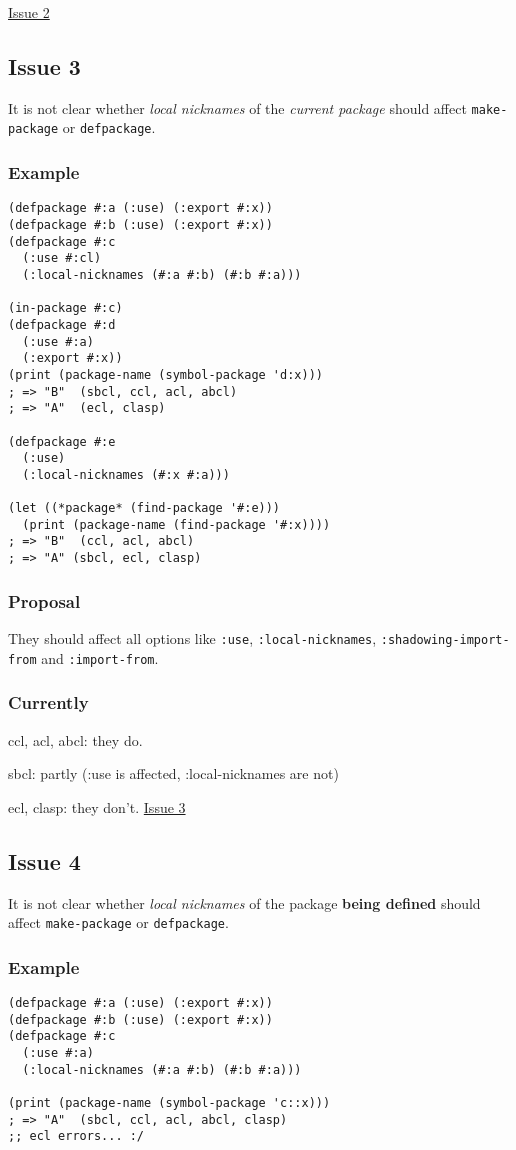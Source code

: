 \documentclass[11pt]{article}
\begin{document}
\href{./issues/2.org}{Issue 2}

\subsection{Issue 3}
\label{sec:orgd0ce84b}
It is not clear whether \emph{local nicknames} of the \emph{current package} should
affect \texttt{make-package} or \texttt{defpackage}.
\subsubsection{Example}
\label{sec:org6e49f48}
\begin{verbatim}
(defpackage #:a (:use) (:export #:x))
(defpackage #:b (:use) (:export #:x))
(defpackage #:c
  (:use #:cl)
  (:local-nicknames (#:a #:b) (#:b #:a)))

(in-package #:c)
(defpackage #:d
  (:use #:a)
  (:export #:x))
(print (package-name (symbol-package 'd:x)))
; => "B"  (sbcl, ccl, acl, abcl)
; => "A"  (ecl, clasp)

(defpackage #:e
  (:use)
  (:local-nicknames (#:x #:a)))

(let ((*package* (find-package '#:e)))
  (print (package-name (find-package '#:x))))
; => "B"  (ccl, acl, abcl)
; => "A" (sbcl, ecl, clasp)
\end{verbatim}
\subsubsection{Proposal}
\label{sec:org8c46325}
They should affect all options like \texttt{:use}, \texttt{:local-nicknames},
\texttt{:shadowing-import-from} and \texttt{:import-from}.
\subsubsection{Currently}
\label{sec:org27d122e}
ccl, acl, abcl: they do.

sbcl: partly (:use is affected, :local-nicknames are not)

 ecl, clasp: they don't.
\href{./issues/3.org}{Issue 3}

\subsection{Issue 4}
\label{sec:org08b43fe}
It is not clear whether \emph{local nicknames} of the package \textbf{being defined}
should affect \texttt{make-package} or \texttt{defpackage}.
\subsubsection{Example}
\label{sec:orgeec8691}
\begin{verbatim}
(defpackage #:a (:use) (:export #:x))
(defpackage #:b (:use) (:export #:x))
(defpackage #:c
  (:use #:a)
  (:local-nicknames (#:a #:b) (#:b #:a)))

(print (package-name (symbol-package 'c::x)))
; => "A"  (sbcl, ccl, acl, abcl, clasp)
;; ecl errors... :/
\end{verbatim}
\end{document}
